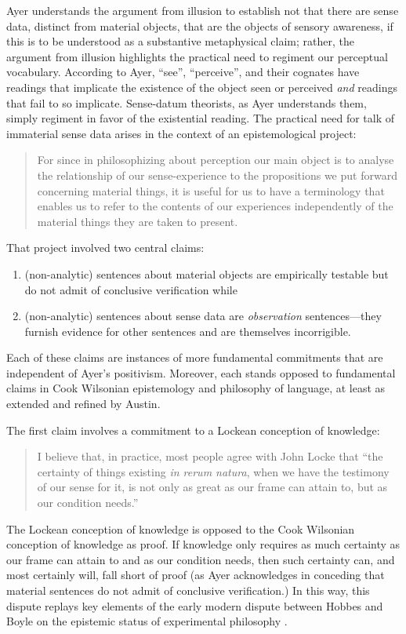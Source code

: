 Ayer understands the argument from illusion to establish not that there are sense data, distinct from material objects, that are the objects of sensory awareness, if this is to be understood as a substantive metaphysical claim; rather, the argument from illusion highlights the practical need to regiment our perceptual vocabulary. According to Ayer, ``see'', ``perceive'', and their cognates have readings that implicate the existence of the object seen or perceived \emph{and} readings that fail to so implicate. Sense-datum theorists, as Ayer understands them, simply regiment in favor of the existential reading. The practical need for talk of immaterial sense data arises in the context of an epistemological project:
\begin{quote}
    For since in philosophizing about perception our main object is to analyse the relationship of our sense-experience to the propositions we put forward concerning material things, it is useful for us to have a terminology that enables us to refer to the contents of our experiences independently of the material things they are taken to present. \citep[]{Ayer:1958kx}
\end{quote}

That project involved two central claims:
\begin{enumerate}
	\item (non-analytic) sentences about material objects are empirically testable but do not admit of conclusive verification while 
	\item (non-analytic) sentences about sense data are \emph{observation} sentences---\-they furnish evidence for other sentences and are themselves incorrigible. 
\end{enumerate}
Each of these claims are instances of more fundamental commitments that are independent of Ayer's positivism. Moreover, each stands opposed to fundamental claims in Cook Wilsonian epistemology and philosophy of language, at least as extended and refined by Austin.

The first claim involves a commitment to a Lockean conception of knowledge:
\begin{quote}
    I believe that, in practice, most people agree with John Locke that ``the certainty of things existing \emph{in rerum natura}, when we have the testimony of our sense for it, is not only as great as our frame can attain to, but as our condition needs.'' \citep[1]{Ayer:1958kx}
\end{quote}
The Lockean conception of knowledge is opposed to the Cook Wilsonian conception of knowledge as proof. If knowledge only requires as much certainty as our frame can attain to and as our condition needs, then such certainty can, and most certainly will, fall short of proof (as Ayer acknowledges in conceding that material sentences do not admit of conclusive verification.) In this way, this dispute replays key elements of the early modern dispute between Hobbes and Boyle on the epistemic status of experimental philosophy \citep[see][for discussion]{Shapin:1985ad}.

